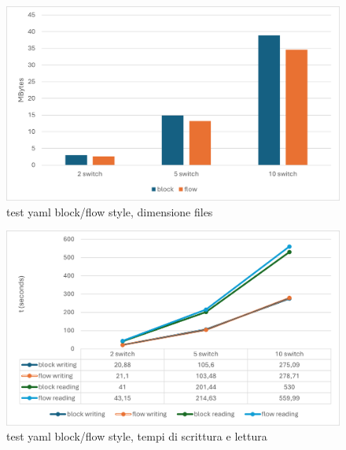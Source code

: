 \documentclass[binding=0.6cm]{sapthesis}
\begin{document}
\begin{figure}[h]
    \centering
    \includegraphics[width=1\textwidth]{immagini/yaml_block_flow_dim.png}
    \caption{test yaml block/flow style, dimensione files}
    \label{fig:yaml_block_flow_dim}
\end{figure}

\begin{figure}[h]
    \centering
    \includegraphics[width=1\textwidth]{immagini/yaml_block_flow_wr.png}
    \caption{test yaml block/flow style, tempi di scrittura e lettura}
    \label{fig:yaml_block_flow_wr}
\end{figure}
\end{document}
